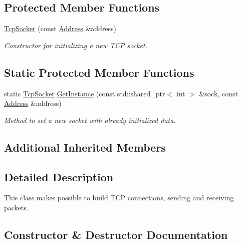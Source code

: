 \subsection*{Protected Member Functions}
\begin{DoxyCompactItemize}
\item 
\hyperlink{classtnnf_1_1_tcp_socket_a10a44011020f350bac067dc589243fcd}{Tcp\+Socket} (const \hyperlink{classtnnf_1_1_address}{Address} \&address)
\begin{DoxyCompactList}\small\item\em Constructor for initializing a new T\+C\+P socket. \end{DoxyCompactList}\end{DoxyCompactItemize}
\subsection*{Static Protected Member Functions}
\begin{DoxyCompactItemize}
\item 
static \hyperlink{classtnnf_1_1_tcp_socket}{Tcp\+Socket} \hyperlink{classtnnf_1_1_tcp_socket_a6ab516c24607c4e644204a46d7ede251}{Get\+Instance} (const std\+::shared\+\_\+ptr$<$ int $>$ \&sock, const \hyperlink{classtnnf_1_1_address}{Address} \&address)
\begin{DoxyCompactList}\small\item\em Method to set a new socket with already initialized data. \end{DoxyCompactList}\end{DoxyCompactItemize}
\subsection*{Additional Inherited Members}


\subsection{Detailed Description}
This class makes possible to build T\+C\+P connections, sending and receiving packets. 

\subsection{Constructor \& Destructor Documentation}
\hypertarget{classtnnf_1_1_tcp_socket_a10a44011020f350bac067dc589243fcd}{}
